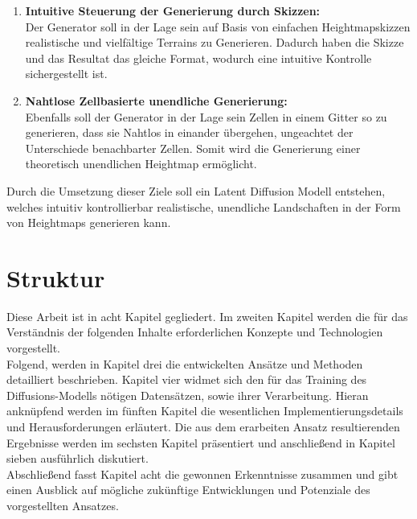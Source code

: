 \begin{enumerate}
    \item \textbf {Intuitive Steuerung der Generierung durch Skizzen:} \\
    Der Generator soll in der Lage sein auf Basis von einfachen Heightmapskizzen realistische und vielfältige Terrains zu Generieren. Dadurch haben die Skizze und das Resultat das gleiche Format, wodurch eine intuitive Kontrolle sichergestellt ist.

    \item \textbf {Nahtlose Zellbasierte unendliche Generierung:} \\
    Ebenfalls soll der Generator in der Lage sein Zellen in einem Gitter so zu generieren, dass sie Nahtlos in einander übergehen, ungeachtet der Unterschiede benachbarter Zellen. Somit wird die Generierung einer theoretisch unendlichen Heightmap ermöglicht.
     
\end{enumerate}

Durch die Umsetzung dieser Ziele soll ein Latent Diffusion Modell entstehen, welches intuitiv kontrollierbar realistische, unendliche Landschaften in der Form von Heightmaps generieren kann.

\section{Struktur}

Diese Arbeit ist in acht Kapitel gegliedert. Im zweiten Kapitel werden die für das Verständnis der folgenden Inhalte erforderlichen Konzepte und Technologien vorgestellt. \\
Folgend, werden in Kapitel drei die entwickelten Ansätze und Methoden detailliert beschrieben. Kapitel vier widmet sich den für das Training des Diffusions-Modells nötigen Datensätzen, sowie ihrer Verarbeitung. Hieran anknüpfend werden im fünften Kapitel die wesentlichen Implementierungsdetails und Herausforderungen erläutert. Die aus dem erarbeiten Ansatz resultierenden Ergebnisse werden im sechsten Kapitel präsentiert und anschließend in Kapitel sieben ausführlich diskutiert. \\
Abschließend fasst Kapitel acht die gewonnen Erkenntnisse zusammen und gibt einen Ausblick auf mögliche zukünftige Entwicklungen und Potenziale des vorgestellten Ansatzes.